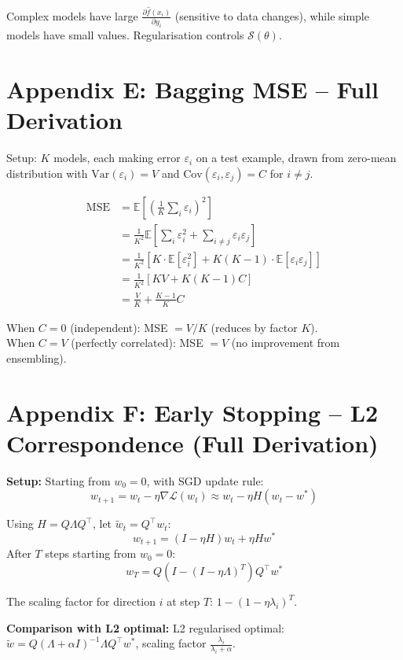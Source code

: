 \documentclass[12pt,a4paper]{article}
\newcommand{\E}{\mathbb{E}}
\newcommand{\Var}{\mathrm{Var}}
\newcommand{\Cov}{\mathrm{Cov}}
\newcommand{\Loss}{\mathcal{L}}
\newcommand{\Reg}{\mathcal{S}}
\begin{document}
Complex models have large $\frac{\partial\hat{f}(x_i)}{\partial y_i}$ (sensitive to data changes), while simple models have small values. Regularisation controls $\Reg(\theta)$.

\section{Appendix E: Bagging MSE -- Full Derivation}

Setup: $K$ models, each making error $\varepsilon_i$ on a test example, drawn from zero-mean distribution with $\Var(\varepsilon_i) = V$ and $\Cov(\varepsilon_i, \varepsilon_j) = C$ for $i \neq j$.

\begin{align*}
\text{MSE}
&= \E\!\left[\left(\frac{1}{K}\sum_i\varepsilon_i\right)^2\right]\\
&= \frac{1}{K^2}
   \E\!\left[\sum_{i}\varepsilon_i^2
              + \sum_{i\neq j}\varepsilon_i\varepsilon_j\right]\\
&= \frac{1}{K^2}
   \left[K\cdot\E[\varepsilon_i^2]
        + K(K-1)\cdot\E[\varepsilon_i\varepsilon_j]\right]\\
&= \frac{1}{K^2}[KV + K(K-1)C]\\
&= \frac{V}{K} + \frac{K-1}{K}C
\end{align*}

When $C = 0$ (independent): MSE $= V/K$ (reduces by factor $K$).\\
When $C = V$ (perfectly correlated): MSE $= V$ (no improvement from ensembling).

\section{Appendix F: Early Stopping -- L2 Correspondence (Full Derivation)}

\textbf{Setup:} Starting from $w_0 = 0$, with SGD update rule:
\[
w_{t+1} = w_t - \eta\nabla\Loss(w_t)
\approx w_t - \eta H(w_t - w^*)
\]

Using $H = Q\Lambda Q^\top$, let $\tilde{w}_t = Q^\top w_t$:
\[
w_{t+1} = (I - \eta H)w_t + \eta Hw^*
\]
After $T$ steps starting from $w_0 = 0$:
\[
w_T = Q(I - (I-\eta\Lambda)^T)Q^\top w^*
\]

The scaling factor for direction $i$ at step $T$: $1 - (1-\eta\lambda_i)^T$.

\textbf{Comparison with L2 optimal:}
L2 regularised optimal: $\tilde{w} = Q(\Lambda+\alpha I)^{-1}\Lambda Q^\top w^*$, scaling factor $\frac{\lambda_i}{\lambda_i+\alpha}$.
\end{document}
